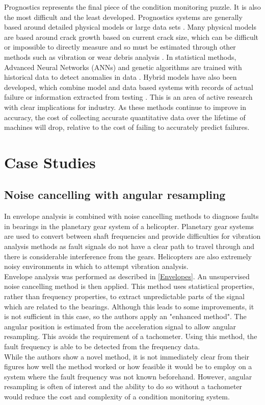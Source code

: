\documentclass[conference]{IEEEtran}
\begin{document}
Prognostics represents the final piece of the condition monitoring puzzle. It is also the most difficult and the least developed. Prognostics systems are generally based around detailed physical models or large data sets \cite{CardenFanning}\cite{Vibration Book}. Many physical models are based around crack growth based on current crack size, which can be difficult or impossible to directly measure and so must be estimated through other methods such as vibration or wear debris analysis \cite{Vibration Book}. In statistical methods, Advanced Neural Networks (ANNs) and genetic algorithms are trained with historical data to detect anomalies in data \cite{CardenFanning}\cite{Vibration Book}. Hybrid models have also been developed, which combine model and data based systems with records of actual failure or information extracted from testing \cite{Vibration Book}. This is an area of active research with clear implications for industry. As these methods continue to improve in accuracy, the cost of collecting accurate quantitative data over the lifetime of machines will drop, relative to the cost of failing to accurately predict failures.

\section{Case Studies}

\subsection{Noise cancelling with angular resampling}
In \cite{Bonnardot} envelope analysis is combined with noise cancelling methods to diagnose faults in bearings in the planetary gear system of a helicopter. Planetary gear systems are used to convert between shaft frequencies and provide difficulties for vibration analysis methods as fault signals do not have a clear path to travel through and there is considerable interference from the gears. Helicopters are also extremely noisy environments in which to attempt vibration analysis.\\
Envelope analysis was performed as described in \ref{Envelopes}. An unsupervised noise cancelling method is then applied. This method uses statistical properties, rather than frequency properties, to extract unpredictable parts of the signal which are related to the bearings. Although this leads to some improvements, it is not sufficient in this case, so the authors apply an "enhanced method". The angular position is estimated from the acceleration signal to allow angular resampling. This avoids the requirement of a tachometer. Using this method, the fault frequency is able to be detected from the frequency data.\\
While the authors show a novel method, it is not immediately clear from their figures how well the method worked or how feasible it would be to employ on a system where the fault frequency was not known beforehand. However, angular resampling is often of interest and the ability to do so without a tachometer would reduce the cost and complexity of a condition monitoring system.
\end{document}
